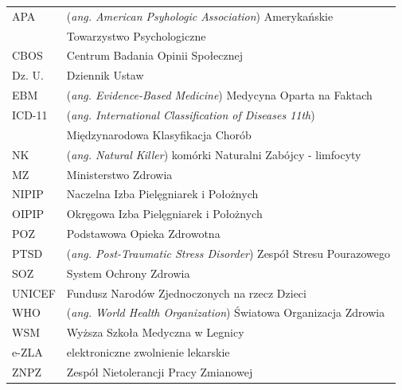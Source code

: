 \documentclass[a4paper,12pt,twoside,openright]{mwrep}
\begin{document}
\begin{table}[ht]
    
    \label{tab:index}
	\begin{tabular}{  l  l  }
	
    APA & (\textit{ang. American Psyhologic Association}) Amerykańskie  \\
        & Towarzystwo Psychologiczne \\
	
	CBOS & Centrum Badania Opinii Społecznej \\

	Dz. U. & Dziennik Ustaw \\

	EBM & (\textit{ang. Evidence-Based Medicine}) Medycyna Oparta na Faktach \\
	
	ICD-11 & (\textit{ang. International Classification of Diseases 11th}) \\ 		    & Międzynarodowa Klasyfikacja Chorób \\
	
	NK & (\textit{ang. Natural Killer}) komórki Naturalni Zabójcy - limfocyty \\

	MZ & Ministerstwo Zdrowia\\

	NIPIP & Naczelna Izba Pielęgniarek i Położnych\\

	OIPIP & Okręgowa Izba Pielęgniarek i Położnych\\

	POZ & Podstawowa Opieka Zdrowotna\\

	PTSD & (\textit{ang. Post-Traumatic Stress Disorder}) Zespół Stresu Pourazowego \\

	SOZ & System Ochrony Zdrowia\\
	
	UNICEF & Fundusz Narodów Zjednoczonych na rzecz Dzieci\\

	WHO & (\textit{ang. World Health Organization}) Światowa Organizacja Zdrowia \\
	
	WSM& Wyższa Szkoła Medyczna w Legnicy\\
     
     e-ZLA & elektroniczne zwolnienie lekarskie \\

	ZNPZ & Zespół Nietolerancji Pracy Zmianowej \\
	

	
	\end{tabular}
   

\end{table}
\end{document}

